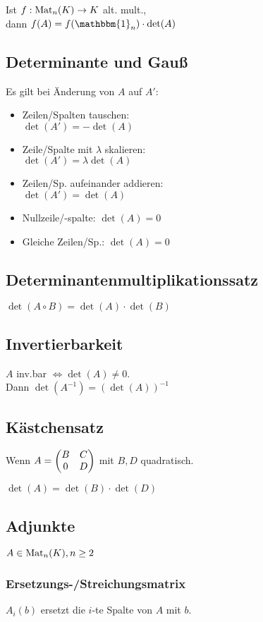 Ist $f: \operatorname{Mat}_n(K)\to K$ alt. mult.,\\
dann $f(A)=f(\mathbbm{1}_n) \cdot \det(A)$

\subsection*{Determinante und Gauß}
Es gilt bei Änderung von $A$ auf $A'$:
\begin{itemize}
	\item Zeilen/Spalten tauschen:\\ $\det(A')=-\det(A)$
	\item Zeile/Spalte mit $\lambda$ skalieren:\\ $\det(A')=\lambda\det(A)$
	\item Zeilen/Sp. aufeinander addieren:\\ $\det(A')=\det(A)$
	\item Nullzeile/-spalte: $\det(A)=0$
	\item Gleiche Zeilen/Sp.: $\det(A)=0$
\end{itemize}

\subsection*{Determinantenmultiplikationssatz}
$\det(A \circ B)=\det(A) \cdot \det(B)$

\subsection*{Invertierbarkeit}
$A$ inv.bar $\iff \det(A) \neq 0$. \\
Dann $\det(A^{-1}) = (\det(A))^{-1}$

\subsection*{Kästchensatz}
Wenn $A=\begin{pmatrix} B & C \\ 0 & D \end{pmatrix}$
mit $B,D$ quadratisch.

$\det(A)=\det(B)\cdot\det(D)$

\subsection*{Adjunkte}
$A \in \operatorname{Mat}_n(K), n \ge 2$

\subsubsection*{Ersetzungs-/Streichungsmatrix}
$A_i(b)$ ersetzt die $i$-te Spalte von $A$ mit $b$.

